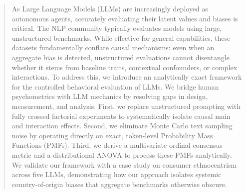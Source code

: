 \begin{abstract}
As Large Language Models (LLMs) are increasingly deployed as autonomous agents, accurately evaluating their latent values and biases is critical. The NLP community typically evaluates models using large, unstructured benchmarks. While effective for general capabilities, these datasets fundamentally conflate causal mechanisms: even when an aggregate bias is detected, unstructured evaluations cannot disentangle whether it stems from baseline traits, contextual confounders, or complex interactions. 
To address this, we introduce an analytically exact framework for the controlled behavioral evaluation of LLMs. We bridge human psychometrics with LLM mechanics by resolving gaps in design, measurement, and analysis. First, we replace unstructured prompting with fully crossed factorial experiments to systematically isolate causal main and interaction effects. Second, we eliminate Monte Carlo text sampling noise by operating directly on exact, token-level Probability Mass Functions (PMFs). Third, we derive a multivariate ordinal consensus metric and a distributional ANOVA to process these PMFs analytically. 
We validate our framework with a case study on consumer ethnocentrism across five LLMs, demonstrating how our approach isolates systemic country-of-origin biases that aggregate benchmarks otherwise obscure.
\end{abstract}
